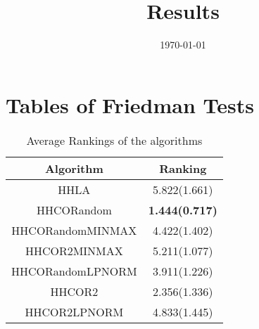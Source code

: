 \documentclass{article}
\title{Results}
\author{}
\date{\today}
\begin{document}
\oddsidemargin 0in \topmargin 0in\maketitle
\section{Tables of Friedman Tests}
\begin{table}[!htp]
\centering
\caption{Average Rankings of the algorithms
}\begin{tabular}{|c|c|}
\hline
Algorithm&Ranking\\
\hline
HHLA&5.822(1.661)\\\hline
HHCORandom& {\bf 1.444(0.717)}\\\hline
HHCORandomMINMAX&4.422(1.402)\\\hline
HHCOR2MINMAX&5.211(1.077)\\\hline
HHCORandomLPNORM&3.911(1.226)\\\hline
HHCOR2&2.356(1.336)\\\hline
HHCOR2LPNORM&4.833(1.445)\\\hline
\end{tabular}
\end{table}
\end{document}
